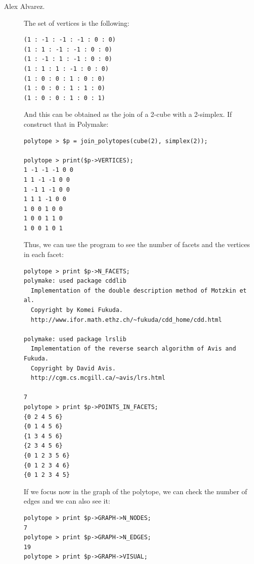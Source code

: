 \begin{description}
\item [Alex Alvarez.] The set of vertices is the following:
\begin{verbatim}
(1 : -1 : -1 : -1 : 0 : 0)
(1 : 1 : -1 : -1 : 0 : 0)
(1 : -1 : 1 : -1 : 0 : 0)
(1 : 1 : 1 : -1 : 0 : 0)
(1 : 0 : 0 : 1 : 0 : 0)
(1 : 0 : 0 : 1 : 1 : 0)
(1 : 0 : 0 : 1 : 0 : 1)
\end{verbatim}
And this can be obtained as the join of a 2-cube with a 2-simplex. If construct that in Polymake:
\begin{verbatim}
polytope > $p = join_polytopes(cube(2), simplex(2));

polytope > print($p->VERTICES);
1 -1 -1 -1 0 0
1 1 -1 -1 0 0
1 -1 1 -1 0 0
1 1 1 -1 0 0
1 0 0 1 0 0
1 0 0 1 1 0
1 0 0 1 0 1
\end{verbatim}

Thus, we can use the program to see the number of facets and the vertices in each facet:

\begin{verbatim}
polytope > print $p->N_FACETS;
polymake: used package cddlib
  Implementation of the double description method of Motzkin et al.
  Copyright by Komei Fukuda.
  http://www.ifor.math.ethz.ch/~fukuda/cdd_home/cdd.html

polymake: used package lrslib
  Implementation of the reverse search algorithm of Avis and Fukuda.
  Copyright by David Avis.
  http://cgm.cs.mcgill.ca/~avis/lrs.html

7
polytope > print $p->POINTS_IN_FACETS;
{0 2 4 5 6}
{0 1 4 5 6}
{1 3 4 5 6}
{2 3 4 5 6}
{0 1 2 3 5 6}
{0 1 2 3 4 6}
{0 1 2 3 4 5}
\end{verbatim}

If we focus now in the graph of the polytope, we can check the number of edges and we can also see it:
\begin{verbatim}
polytope > print $p->GRAPH->N_NODES;
7
polytope > print $p->GRAPH->N_EDGES;
19
polytope > print $p->GRAPH->VISUAL;
\end{verbatim}


\end{description}
